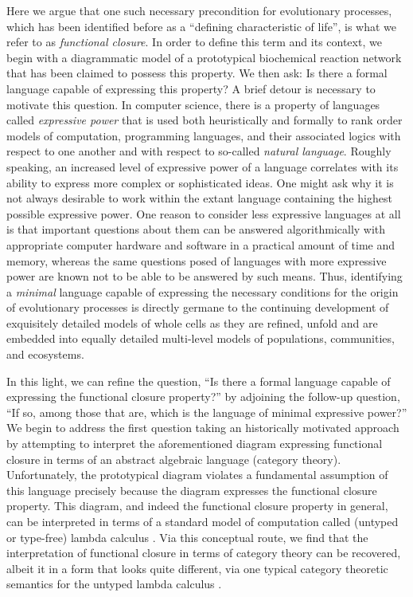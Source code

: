 Here we argue that one such necessary precondition for evolutionary processes, which has been identified before as a ``defining characteristic of life''\cite{Rosen1972,Rosen1978,Rosen1985,Rosen1991}, is what we refer to as \emph{functional closure}. In order to define this term and its context, we begin with a diagrammatic model of a prototypical biochemical reaction network that has been claimed to possess this property. We then ask: Is there a formal language capable of expressing this property? A brief detour is necessary to motivate this question. In computer science, there is a property of languages called \emph{expressive power} that is used both heuristically and formally to rank order models of computation, programming languages, and their associated logics with respect to one another and with respect to so-called \emph{natural language}. Roughly speaking, an increased level of expressive power of a language correlates with its ability to express more complex or sophisticated ideas. One might ask why it is not always desirable to work within the extant language containing the highest possible expressive power. One reason to consider less expressive languages at all is that important questions about them can be answered algorithmically with appropriate computer hardware and software in a practical amount of time and memory, whereas the same questions posed of languages with more expressive power are known not to be able to be answered by such means\cite{Hopcroft2007}. Thus, identifying a \emph{minimal} language capable of expressing the necessary conditions for the origin of evolutionary processes is directly germane to the continuing development of exquisitely detailed models of whole cells as they are refined, unfold and are embedded into equally detailed multi-level models of populations, communities, and ecosystems.

In this light, we can refine the question, ``Is there a formal language capable of expressing the functional closure property?'' by adjoining the follow-up question, ``If so, among those that are, which is the language of minimal expressive power?'' We begin to address the first question taking an historically motivated approach \cite{Rosen1972,Letelier2006} by attempting to interpret the aforementioned diagram expressing functional closure in terms of an abstract algebraic language (category theory). Unfortunately, the prototypical diagram violates a fundamental assumption of this language precisely because the diagram expresses the functional closure property. This diagram, and indeed the functional closure property in general, can be interpreted in terms of a standard model of computation called (untyped or type-free) lambda calculus \cite{Mossio2009}. Via this conceptual route, we find that the interpretation of functional closure in terms of category theory can be recovered, albeit it in a form that looks quite different, via one typical category theoretic semantics for the untyped lambda calculus \cite{Scott1980,Barendregt1985,Abramsky1995}.

